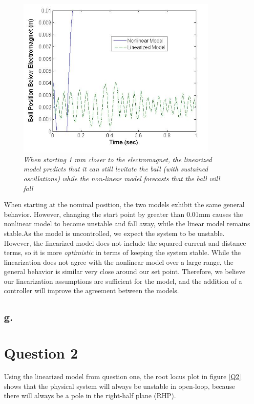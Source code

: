 \documentclass{article}
\theoremstyle{plain}
\theoremstyle{definition}
\theoremstyle{remark}
\begin{document}
\begin{figure}[htb]
\begin{center}
\includegraphics[width = 10cm]{Part1fFarDisturbance}
\caption{\emph{When starting 1 mm closer to the electromagnet, the linearized model predicts that it can still levitate the ball (with sustained oscillations) while the non-linear model forecasts that the ball will fall}}
\label{Q1_f3}
\end{center}
\end{figure}

When starting at the nominal position, the two models exhibit the same general behavior. However, changing the start point by greater than 0.01mm causes the nonlinear model to become unstable and fall away, while the linear model remains stable.As the model is uncontrolled, we expect the system to be unstable. However, the linearized model does not include the squared current and distance terms, so it is more \emph{optimistic} in terms of keeping the system stable. While the linearization does not agree with the nonlinear model over a large range, the general behavior is similar very close around our set point. Therefore, we believe our linearization assumptions are sufficient for the model, and the addition of a controller will improve the agreement between the models.

\subsection*{g.}

\section*{Question 2}
Using the linearized model from question one, the root locus plot in figure \ref{Q2} shows that the physical system will always be unstable in open-loop, because there will always be a pole in the right-half plane (RHP).\\
\end{document}
